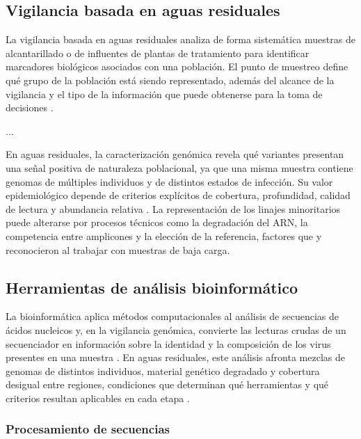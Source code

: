 \subsection{Vigilancia basada en aguas residuales}

La vigilancia basada en aguas residuales analiza de forma sistemática muestras de alcantarillado o de influentes de plantas de tratamiento para identificar marcadores biológicos asociados con una población. El punto de muestreo define qué grupo de la población está siendo representado, además del alcance de la vigilancia y el tipo de la información que puede obtenerse para la toma de decisiones \cite{Parkins_2023}.

... 

En aguas residuales, la caracterización genómica revela qué variantes presentan una señal positiva de naturaleza poblacional, ya que una misma muestra contiene genomas de múltiples individuos y de distintos estados de infección. Su valor epidemiológico depende de criterios explícitos de cobertura, profundidad, calidad de lectura y abundancia relativa \cite{Parkins_2023,Child_2023}. La representación de los linajes minoritarios puede alterarse por procesos técnicos como la degradación del ARN, la competencia entre amplicones y la elección de la referencia, factores que  y  reconocieron al trabajar con muestras de baja carga.

\subsection{Herramientas de análisis bioinformático}

La bioinformática aplica métodos computacionales al análisis de secuencias de ácidos nucleicos y, en la vigilancia genómica, convierte las lecturas crudas de un secuenciador en información sobre la identidad y la composición de los virus presentes en una muestra \cite{Dash_2024}. En aguas residuales, este análisis afronta mezclas de genomas de distintos individuos, material genético degradado y cobertura desigual entre regiones, condiciones que determinan qué herramientas y qué criterios resultan aplicables en cada etapa \cite{Child_2023}.

\subsubsection{Procesamiento de secuencias}

